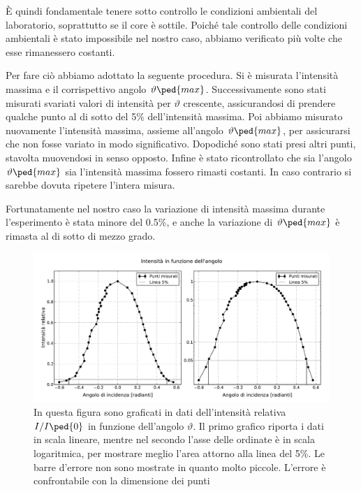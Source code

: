 È quindi fondamentale tenere sotto controllo le condizioni ambientali del laboratorio, soprattutto se il core è sottile. Poiché tale controllo delle condizioni ambientali è stato impossibile nel nostro caso, abbiamo verificato più volte che esse rimanessero costanti.

Per fare ciò abbiamo adottato la seguente procedura. Si è misurata l'intensità massima e il corrispettivo angolo $\vartheta\ped{max}$.
Successivamente sono stati misurati svariati valori di intensità per $\vartheta$ crescente, assicurandosi di prendere qualche punto
al di sotto del 5\% dell'intensità massima. Poi abbiamo misurato nuovamente l'intensità massima, assieme all'angolo $\vartheta\ped{max}$,
per assicurarsi che non fosse variato in modo significativo. Dopodiché sono stati presi altri punti, stavolta muovendosi in senso opposto.
Infine è stato ricontrollato che sia l'angolo $\vartheta\ped{max}$ sia l'intensità massima fossero rimasti costanti. In caso
contrario si sarebbe dovuta ripetere l'intera misura.

Fortunatamente nel nostro caso la variazione di intensità massima durante l'esperimento è stata minore del 0.5\%, e anche la variazione
di $\vartheta\ped{max}$ è rimasta al di sotto di mezzo grado. 

\begin{figure}[t!]
    \centering
    \includegraphics[width=160mm]{double_plot.pdf}
	\caption{In questa figura sono graficati in dati dell'intensità relativa $I/I\ped{0}$ in funzione dell'angolo $\vartheta$.
	    Il primo grafico riporta i dati in scala lineare, mentre nel secondo l'asse delle ordinate è in scala logaritmica, per mostrare
	    meglio l'area attorno alla linea del 5\%. Le barre d'errore non sono mostrate in quanto molto piccole.
	    L'errore è confrontabile con la dimensione dei punti}
	\label{fig:graph}
\end{figure}
